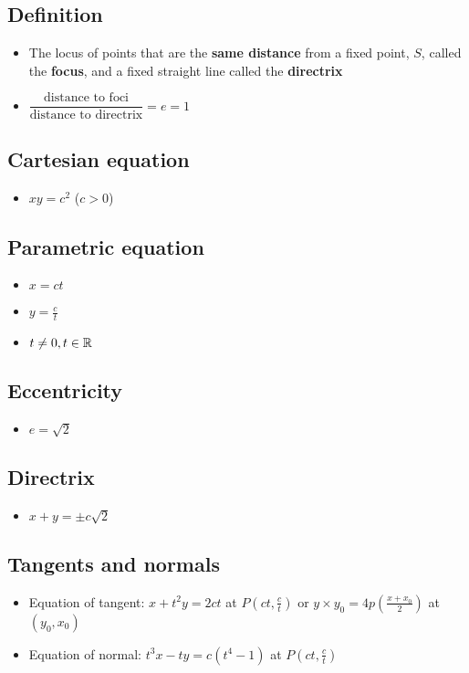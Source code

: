 \subsection{Definition}
\begin{itemize}
    \item The locus of points that are the \textbf{same distance} from a fixed point, $S$,
          called the \textbf{focus}, and a fixed straight line called the \textbf{directrix}
    \item $\dfrac{\text{distance to foci}}{\text{distance to directrix}} = e = 1$
\end{itemize}
\subsection{Cartesian equation}
\begin{itemize}
    \item $xy=c^2$ ($c>0$)
\end{itemize}
\subsection{Parametric equation}
\begin{itemize}
    \item $x=ct$
    \item $y=\frac{c}{t}$
    \item $t \neq 0, t\in\operatorname{\mathbb{R}}$
\end{itemize}
\subsection{Eccentricity}
\begin{itemize}
    \item $e=\sqrt{2}$
\end{itemize}
\subsection{Directrix}
\begin{itemize}
    \item $x+y=\pm c\sqrt{2}$
\end{itemize}
\subsection{Tangents and normals}
\begin{itemize}
    \item Equation of tangent: $x+t^2y=2ct$ at $P\left(ct, \frac{c}{t}\right)$ or
    $y\times y_0 = 4p \left(\frac{x+x_0}{2}\right)$ at $(y_0, x_0)$
    \item Equation of normal: $t^3x-ty=c\left(t^4-1\right)$ at $P\left(ct, \frac{c}{t}\right)$
\end{itemize}

